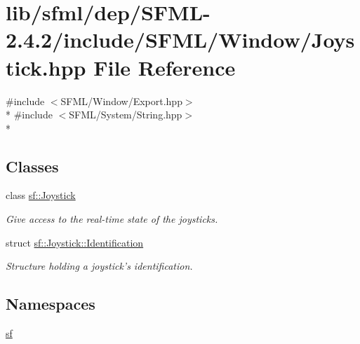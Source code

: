 \hypertarget{sfml_2dep_2_s_f_m_l-2_84_82_2include_2_s_f_m_l_2_window_2_joystick_8hpp}{\section{lib/sfml/dep/\-S\-F\-M\-L-\/2.4.2/include/\-S\-F\-M\-L/\-Window/\-Joystick.hpp File Reference}
\label{sfml_2dep_2_s_f_m_l-2_84_82_2include_2_s_f_m_l_2_window_2_joystick_8hpp}
}
{\ttfamily \#include $<$S\-F\-M\-L/\-Window/\-Export.\-hpp$>$}\\*
{\ttfamily \#include $<$S\-F\-M\-L/\-System/\-String.\-hpp$>$}\\*
\subsection*{Classes}
\begin{DoxyCompactItemize}
\item 
class \hyperlink{classsf_1_1_joystick}{sf\-::\-Joystick}
\begin{DoxyCompactList}\small\item\em Give access to the real-\/time state of the joysticks. \end{DoxyCompactList}\item 
struct \hyperlink{structsf_1_1_joystick_1_1_identification}{sf\-::\-Joystick\-::\-Identification}
\begin{DoxyCompactList}\small\item\em Structure holding a joystick's identification. \end{DoxyCompactList}\end{DoxyCompactItemize}
\subsection*{Namespaces}
\begin{DoxyCompactItemize}
\item 
\hyperlink{namespacesf}{sf}
\end{DoxyCompactItemize}
